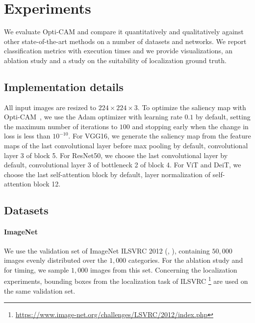 \section{Experiments}
\label{sec:oc_exp}
We evaluate Opti-CAM and compare it quantitatively and qualitatively against other state-of-the-art 
methods on a number of datasets and networks. We report classification metrics with execution times 
and we provide visualizations, an ablation study and a study on the suitability of localization 
ground truth.

\subsection{Implementation details}
\label{sec:oc_details}

All input images are resized to $224 \times 224 \times 3$. To optimize the saliency map with 
Opti-CAM~, we use the Adam \autocite{kingma2014adam} optimizer with learning rate $0.1$ by 
default, setting the maximum number of iterations to $100$ and stopping early when the change in 
loss is less than $10^{-10}$. For VGG16, we generate the saliency map  from the feature 
maps of the last convolutional layer before max pooling by default, \ie convolutional layer 3 of 
block 5. For ResNet50, we choose the last convolutional layer by default, \ie convolutional layer 3 
of bottleneck 2 of block 4. For ViT and DeiT, we choose the last self-attention block by default, 
\ie layer normalization of self-attention block 12. 

\subsection{Datasets}
\label{sec:oc_data}

\paragraph{ImageNet}
We use the validation set of ImageNet ILSVRC 2012 (\cite{krizhevsky2012imagenet}, \cite{ILSVRC15}), 
containing $50,000$ images evenly distributed over the $1,000$ categories. For the ablation study 
and for timing, we sample $1,000$ images from this set. Concerning the localization experiments, 
bounding boxes from the localization task of ILSVRC
\footnote{\url{https://www.image-net.org/challenges/LSVRC/2012/index.php}} are used on the same 
validation set.

